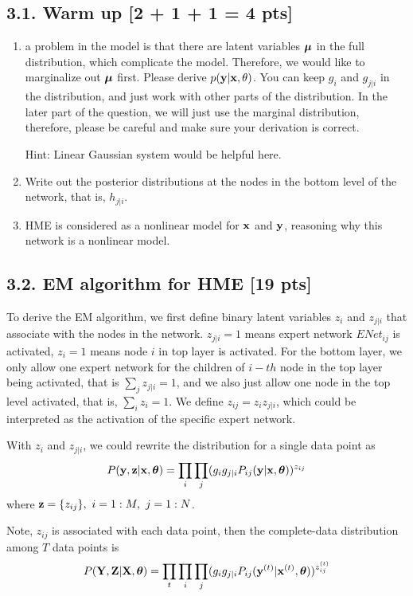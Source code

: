 \subsection*{3.1. Warm up [2 + 1 + 1 = 4 pts]}

\begin{enumerate}
\item a problem in the model is that there are latent variables $\boldsymbol \mu$ in the full distribution, which complicate the model. Therefore, we would like to marginalize out $\boldsymbol \mu$ first. Please derive $p(\mathbf{y}|\mathbf{x}, \theta)$. You can keep $g_{i}$ and $g_{j|i}$ in the distribution, and just work with other parts of the distribution. In the later part of the question, we will just use the marginal distribution, therefore, please be careful and make sure your derivation is correct. 

Hint: Linear Gaussian system would be helpful here.

\item Write out the posterior distributions at the nodes in the bottom level of the network, that is, $h_{j|i}$. 

\item HME is considered as a nonlinear model for $\mathbf{x}$ and $\mathbf{y}$, reasoning why this network is a nonlinear model.  

\end{enumerate}


\subsection*{3.2. EM algorithm for HME [19 pts]}

To derive the EM algorithm, we first define binary latent variables $z_i$ and $z_{j|i}$ that associate with the nodes in the network. $z_{j|i}=1$ means expert network $ENet_{ij}$ is activated, $z_i=1$ means node $i$ in top layer is activated. For the bottom layer, we only allow one expert network for the children of $i-th$ node in the top layer being activated, that is $\sum_{j}z_{j|i} = 1$, and we also just allow one node in the top level activated, that is, $\sum_{i}z_i=1$. We define $z_{ij}= z_{i}z_{j|i}$, which could be interpreted as the activation of the specific expert network.

With $z_i$ and $z_{j|i}$, we could rewrite the distribution for a single data point as
$$P(\mathbf{y}, \mathbf{z}|\mathbf{x}, \boldsymbol \theta) = \prod_{i}\prod_{j}(g_i g_{j|i}P_{ij}(\mathbf{y}|\mathbf{x},\boldsymbol \theta))^{z_{ij}}$$
where $\mathbf{z} =\{z_{ij}\},~i=1:M,~j=1:N$. 

Note, $z_{ij}$ is associated with each data point, then the complete-data distribution among $T$ data points is
$$P(\mathbf{Y}, \mathbf{Z}|\mathbf{X}, \boldsymbol \theta) = \prod_{t}\prod_{i}\prod_{j}(g_ig_{j|i}P_{ij}(\mathbf{y}^{(t)}|\mathbf{x}^{(t)},\boldsymbol \theta))^{z^{(t)}_{ij}}$$

